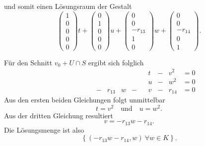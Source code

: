 \documentclass[a4paper,oneside, 11pt, openany%
]{article}
\theoremstyle{custom}
\theoremstyle{custom}
\begin{document}
und somit einen Lösungsraum der Gestalt
\begin{equation*}
	\begin{pmatrix}
		1\\
		0\\
		0\\
		0\\
		0
	\end{pmatrix}t +
	\begin{pmatrix}
		0\\
		1\\
		0\\
		0\\
		0
	\end{pmatrix}u +
	\begin{pmatrix}
		0\\
		0\\
		-r_{13}\\			
		1\\
		0
	\end{pmatrix}w +
	\begin{pmatrix}
		0\\
		0\\
		-r_{14}\\
		0\\
		1
	\end{pmatrix}.
\end{equation*}

Für den Schnitt $v_0 + U \cap S $ ergibt sich folglich
\begin{equation*}
	\begin{alignedat}{14}
		&&&&&&&&&&&t&-&v^2&= 0\\
		&&&&&&&&&&&u&-&w^2&= 0\\
		&&&&&&-&r_{13}&w&-&&v&-&r_{14}&=0
	\end{alignedat}
\end{equation*}
Aus den ersten beiden Gleichungen folgt unmittelbar
\begin{equation*}
	t = v^2 \quad \text{und} \quad u = w^2.
\end{equation*}
Aus der dritten Gleichung resultiert
\begin{equation*}
	v = -r_{13}w-r_{14}.
\end{equation*}
Die Lösungsmenge ist also 
\begin{equation*}
	\left\lbrace (-r_{13}w-r_{14},w)  \ \forall w \in K\right\rbrace.
\end{equation*}
\end{document}
